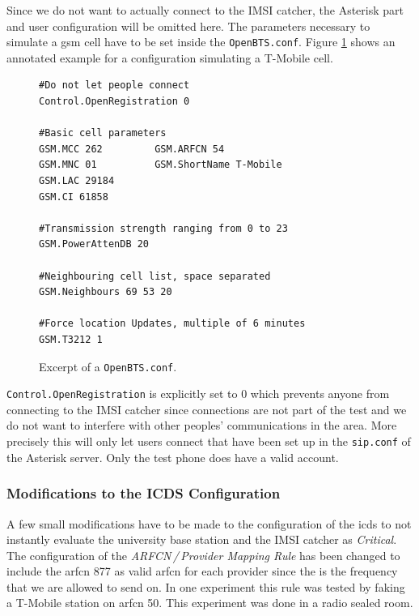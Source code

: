 Since we do not want to actually connect to the IMSI catcher, the Asterisk part and user configuration will be omitted here.
The parameters necessary to simulate a \gls{gsm} cell have to be set inside the \texttt{OpenBTS.conf}.
Figure \ref{fig:openbts_parameters} shows an annotated example for a configuration simulating a T-Mobile cell.
\begin{figure}
\hspace*{\dimexpr\fboxsep+\fboxrule}%
\begin{minipage}{\dimexpr\textwidth-4\fboxsep-2\fboxrule} 
\begin{lstlisting}
#Do not let people connect
Control.OpenRegistration 0

#Basic cell parameters
GSM.MCC 262			GSM.ARFCN 54
GSM.MNC 01			GSM.ShortName T-Mobile
GSM.LAC 29184		
GSM.CI 61858
	
#Transmission strength ranging from 0 to 23
GSM.PowerAttenDB 20

#Neighbouring cell list, space separated
GSM.Neighbours 69 53 20

#Force location Updates, multiple of 6 minutes
GSM.T3212 1
\end{lstlisting}
\end{minipage}
\caption{Excerpt of a \texttt{OpenBTS.conf}.}
\label{fig:openbts_parameters}
\end{figure}
\texttt{Control.OpenRegistration} is explicitly set to 0 which prevents anyone from connecting to the IMSI catcher since connections are not part of the test and we do not want to interfere with other peoples' communications in the area.
More precisely this will only let users connect that have been set up in the \texttt{sip.conf} of the Asterisk server.
Only the test phone does have a valid account.

\subsubsection{Modifications to the ICDS Configuration}
A few small modifications have to be made to the configuration of the \gls{icds} to not instantly evaluate the university base station and the IMSI catcher as \emph{Critical}.
The configuration of the \emph{ARFCN\,/\,Provider Mapping Rule} has been changed to include the \gls{arfcn} 877 as valid \gls{arfcn} for each provider since the is the frequency that we are allowed to send on.
In one experiment this rule was tested by faking a T-Mobile station on \gls{arfcn} 50.
This experiment was done in a radio sealed room.



